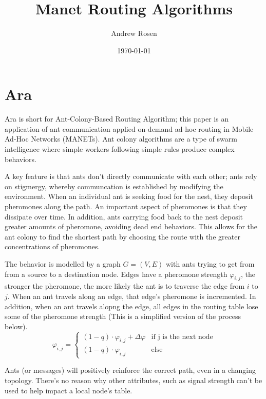 \documentclass[a4paper]{article}
\title{Manet Routing Algorithms}
\author{Andrew Rosen}
\date{\today}
\begin{document}
\maketitle
\section{Ara}
Ara \cite{ara-ants} is short for Ant-Colony-Based Routing Algorithm; this paper is an application of ant communication applied on-demand ad-hoc routing in Mobile Ad-Hoc Networks (MANETs).
Ant colony algorithms are a type of swarm intelligence where simple workers following simple rules produce complex behaviors.  


A key feature is that ants don't directly communicate with each other; ants rely on stigmergy, whereby communcation is established by modifying the environment.
When an individual ant is seeking food for the nest, they deposit pheromones along the path.  An important aspect of pheromones is that they dissipate over time.  In addition, ants carrying food back to the nest deposit greater amounts of pheromone, avoiding dead end behaviors.  This allows for the ant colony to find the shortest path by choosing the route with the greater concentrations of pheromones. 

The behavior is modelled by a graph $G = (V, E)$ with ants trying to get from from a source to a destination node. Edges have a pheromone strength $\varphi_{i,j}$, the stronger the pheromone, the more likely the ant is to traverse the edge from $i$ to $j$.  When an ant travels along an edge, that edge's pheromone is incremented.  In addition, when an ant travels alopng the edge, all edges in the routing table lose some of the pheromone strength (This is a simplified version of the process below).
\[
\varphi_{i,j} =
\begin{cases}
    (1-q) \cdot \varphi_{i,j} + \Delta\varphi & \text{if j is the next node}  \\
    (1-q) \cdot \varphi_{i,j}       & \text{else}
\end{cases}
\]

Ants (or messages) will positively reinforce the correct path, even in a changing topology.  There's no reason why other attributes, such as signal strength can't be used to help impact a local node's table.
\end{document}

